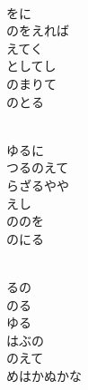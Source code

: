 \documentclass[10pt,b5j]{tarticle} %
\begin{document}
\vspace{1.5em} %
\newcommand{\linespace}{0.5em} %
\newcommand{\blocksize}{0.5\hsize} %
\newcommand{\itemmargin}{6em} %
\begin{enumerate} %
    \setlength{\itemindent}{\itemmargin} %
    \begin{minipage}[c]{\blocksize}
    
        \vspace{\linespace}
        \item~\\
        をに\\
        のをえれば\\
        えてく\\
        としてし\\
        のまりて\\
        のとる
        
        \vspace{\linespace}
        \item~\\
        ゆるに\\
        つるのえて\\
        らざるやや\\
        えし\\
        ののを\\
        のにる
        
        \vspace{\linespace}
        \item~\\
        るの\\
        のる\\
        ゆる\\
        はぶの\\
        のえて\\
        めはかぬかな
        

\end{minipage}
\end{enumerate}
\end{document}
